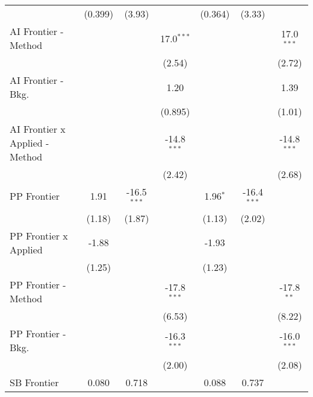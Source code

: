 \begin{tabular}{lcccccc}
                                  & (0.399)        & (3.93)        &                & (0.364)       & (3.33)         &   \\   
   AI Frontier - Method           &                &               & 17.0$^{***}$   &               &                & 17.0$^{***}$\\   
                                  &                &               & (2.54)         &               &                & (2.72)\\   
   AI Frontier - Bkg.             &                &               & 1.20           &               &                & 1.39\\   
                                  &                &               & (0.895)        &               &                & (1.01)\\   
   AI Frontier x Applied - Method &                &               & -14.8$^{***}$  &               &                & -14.8$^{***}$\\   
                                  &                &               & (2.42)         &               &                & (2.68)\\   
   PP Frontier                    & 1.91           & -16.5$^{***}$ &                & 1.96$^{*}$    & -16.4$^{***}$  &   \\   
                                  & (1.18)         & (1.87)        &                & (1.13)        & (2.02)         &   \\   
   PP Frontier x Applied          & -1.88          &               &                & -1.93         &                &   \\   
                                  & (1.25)         &               &                & (1.23)        &                &   \\   
   PP Frontier - Method           &                &               & -17.8$^{***}$  &               &                & -17.8$^{**}$\\   
                                  &                &               & (6.53)         &               &                & (8.22)\\   
   PP Frontier - Bkg.             &                &               & -16.3$^{***}$  &               &                & -16.0$^{***}$\\   
                                  &                &               & (2.00)         &               &                & (2.08)\\   
   SB Frontier                    & 0.080          & 0.718         &                & 0.088         & 0.737          &   \\   

\end{tabular}
